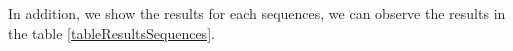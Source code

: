 \begin{table}[H]
\centering

\caption{Results of our algorithm.}
\label{tableResults}
\end{table}






In addition, we show the results for each sequences, we can observe the results in the table \ref{tableResultsSequences}. 




